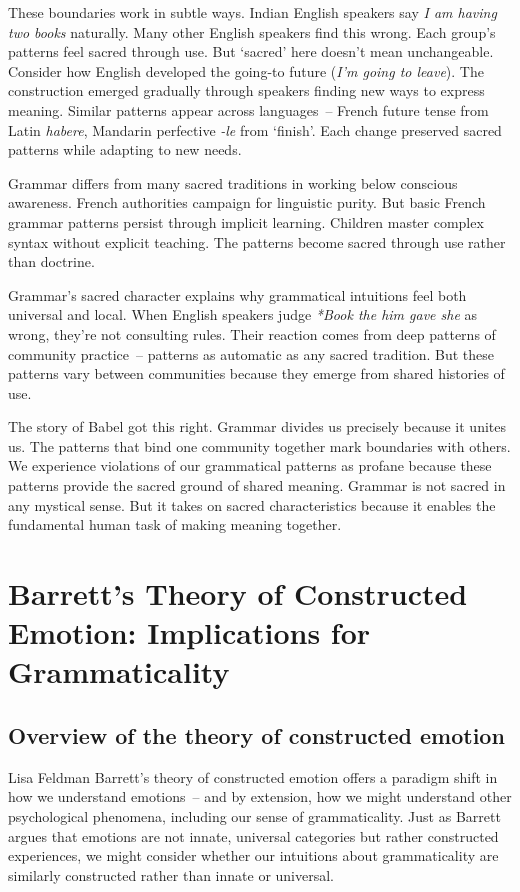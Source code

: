 These boundaries work in subtle ways. Indian English speakers say \textit{I am having two books} naturally. Many other English speakers find this wrong. Each group's patterns feel sacred through use. But `sacred' here doesn't mean unchangeable. Consider how English developed the going-to future (\textit{I'm going to leave}). The construction emerged gradually through speakers finding new ways to express meaning. Similar patterns appear across languages~-- French future tense from Latin \textit{habere}, Mandarin perfective \textit{-le} from `finish'. Each change preserved sacred patterns while adapting to new needs.

Grammar differs from many sacred traditions in working below conscious awareness. French authorities campaign for linguistic purity. But basic French grammar patterns persist through implicit learning. Children master complex syntax without explicit teaching. The patterns become sacred through use rather than doctrine.

Grammar's sacred character explains why grammatical intuitions feel both universal and local. When English speakers judge \textit{*Book the him gave she} as wrong, they're not consulting rules. Their reaction comes from deep patterns of community practice~-- patterns as automatic as any sacred tradition. But these patterns vary between communities because they emerge from shared histories of use.

The story of Babel got this right. Grammar divides us precisely because it unites us. The patterns that bind one community together mark boundaries with others. We experience violations of our grammatical patterns as profane because these patterns provide the sacred ground of shared meaning. Grammar is not sacred in any mystical sense. But it takes on sacred characteristics because it enables the fundamental human task of making meaning together.

\section{Barrett's Theory of Constructed Emotion: Implications for Grammaticality}

\subsection{Overview of the theory of constructed emotion}

Lisa Feldman Barrett's theory of constructed emotion offers a paradigm shift in how we understand emotions~-- and by extension, how we might understand other psychological phenomena, including our sense of grammaticality. Just as Barrett argues that emotions are not innate, universal categories but rather constructed experiences, we might consider whether our intuitions about grammaticality are similarly constructed rather than innate or universal.

